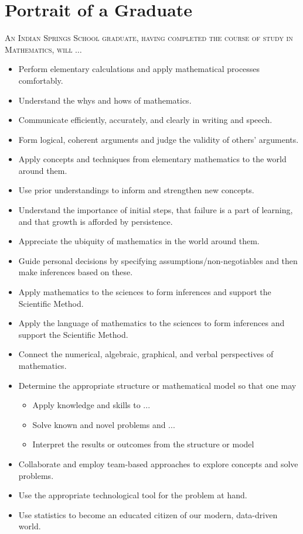 \section{Portrait of a Graduate}

\textsc{An Indian Springs School graduate, having completed the course of study in Mathematics, will} $\ldots$ 

\begin{itemize}
\item Perform elementary calculations and apply mathematical processes comfortably.
\item Understand the whys and hows of mathematics.
\item Communicate efficiently, accurately, and clearly in writing and speech.
\item Form logical, coherent arguments and judge the validity of others’ arguments.
\item Apply concepts and techniques from elementary mathematics to the world around them.
\item Use prior understandings to inform and strengthen new concepts.
\item Understand the importance of initial steps, that failure is a part of learning, and that growth is afforded by persistence.
\item Appreciate the ubiquity of mathematics in the world around them.
\item Guide personal decisions by specifying assumptions/non-negotiables and then make inferences based on these.
\item Apply mathematics to the sciences to form inferences and support the Scientific Method.
\item Apply the language of mathematics to the sciences to form inferences and support the Scientific Method.
\item Connect the numerical, algebraic, graphical, and verbal perspectives of mathematics.
\item Determine the appropriate structure or mathematical model so that one may
\begin{itemize}
\item Apply knowledge and skills to ...
\item Solve known and novel problems and ...
\item Interpret the results or outcomes from the structure or model
\end{itemize}
\item Collaborate and employ team-based approaches to explore concepts and solve problems.
\item Use the appropriate technological tool for the problem at hand.
\item Use statistics to become an educated citizen of our modern, data-driven world.

\end{itemize}